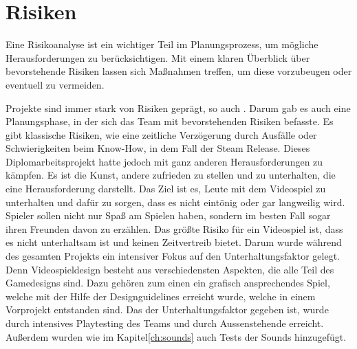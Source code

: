 
\section{Risiken}\label{sec:risiken}

\renewcommand{\kapitelautor}{Autor: Nils} %
%
Eine Risikoanalyse ist ein wichtiger Teil im Planungsprozess, um mögliche Herausforderungen zu berücksichtigen.
Mit einem klaren Überblick über bevorstehende Risiken lassen sich Maßnahmen treffen, um diese vorzubeugen oder eventuell zu vermeiden.\cite{AsanaRisiken}

Projekte sind immer stark von Risiken geprägt, so auch \ff. Darum gab es auch eine Planungsphase, in der sich das Team mit bevorstehenden Risiken befasste.
Es gibt klassische Risiken, wie eine zeitliche Verzögerung durch Ausfälle oder Schwierigkeiten beim Know-How, in dem Fall der Steam Release.
Dieses Diplomarbeitsprojekt hatte jedoch mit ganz anderen Herausforderungen zu kämpfen. Es ist die Kunst, andere zufrieden zu stellen und zu unterhalten, die eine Herausforderung darstellt.
Das Ziel ist es, Leute mit dem Videospiel zu unterhalten und dafür zu sorgen, dass es nicht eintönig oder gar langweilig wird.
Spieler sollen nicht nur Spaß am Spielen haben, sondern im besten Fall sogar ihren Freunden davon zu erzählen.
Das größte Risiko für ein Videospiel ist, dass es nicht unterhaltsam ist und keinen Zeitvertreib bietet. Darum wurde während des gesamten Projekts ein intensiver Fokus auf den Unterhaltungsfaktor gelegt.
Denn Videospieldesign besteht aus verschiedensten Aspekten, die alle Teil des Gamedesigns sind.
Dazu gehören zum einen ein grafisch ansprechendes Spiel, welche mit der Hilfe der Designguidelines erreicht wurde, welche in einem Vorprojekt entstanden sind.
Das der Unterhaltungsfaktor gegeben ist, wurde durch intensives Playtesting des Teams und durch Aussenstehende erreicht.
Außerdem wurden wie im Kapitel\ref{ch:sounds} auch Tests der Sounds hinzugefügt.
%

\renewcommand{\kapitelautor}{}
